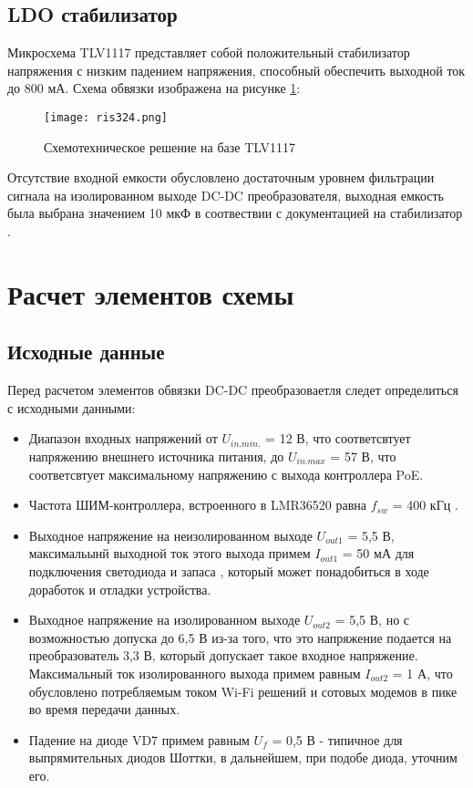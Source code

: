 \subsection{LDO стабилизатор}
\hspace{1cm}

Микросхема TLV1117 представляет собой положительный стабилизатор напряжения с низким падением напряжения, 
способный обеспечить выходной ток до 800 мА. Схема обвязки изображена на рисунке \ref{ris:324}: 

\begin{figure}[H]
    \centering
    \texttt{[image: ris324.png]}
    \caption{Схемотехническое решение на базе TLV1117}
    \label{ris:324}
\end{figure}

Отсутствие входной емкости обусловлено достаточным уровнем фильтрации сигнала на изолированном выходе 
DC-DC преобразователя, выходная емкость была выбрана значением 10 мкФ в соотвествии с документацией 
на стабилизатор \cite{TLV1117:datasheet}. 



\section{Расчет элементов схемы}
\subsection{Исходные данные}
\hspace{1cm} 

Перед расчетом элементов обвязки DC-DC преобразоваетля следет определиться с исходными данными:

\begin{itemize}
    \item Диапазон входных напряжений от $U_{in.min.}$ = 12 В, что соответсвтует напряжению
    внешнего источника питания, до $U_{in.max}$ = 57 В, что соответсвтует максимальному
    напряжению с выхода контроллера PoE. 
    \item Частота ШИМ-контроллера, встроенного в LMR36520 равна $f_{sw}$ = 400 кГц 
    \cite{LMR36520:datasheet}. 
    \item Выходное напряжение на неизолированном выходе $U_{out1}$ = 5,5 В, максимальынй 
    выходной ток этого выхода примем $I_{out1}$ = 50 мА для подключения светодиода и запаса 
    , который может понадобиться в ходе доработок и отладки устройства. 
    \item Выходное напряжение на изолированном выходе $U_{out2}$ = 5,5 В, но с возможностью допуска
    до 6,5 В из-за того, что это напряжение подается на преобразователь 3,3 В, который допускает 
    такое входное напряжение. Максимальный ток изолированного выхода примем равным $I_{out2}$ = 1 А,
    что обусловлено потребляемым током Wi-Fi решений и сотовых модемов в пике во время передачи 
    данных. 
    \item Падение на диоде VD7 примем равным $U_{f}$ = 0,5 В - типичное для выпрямительных диодов Шоттки, 
    в дальнейшем, при подобе диода, уточним его.
    
\end{itemize}

